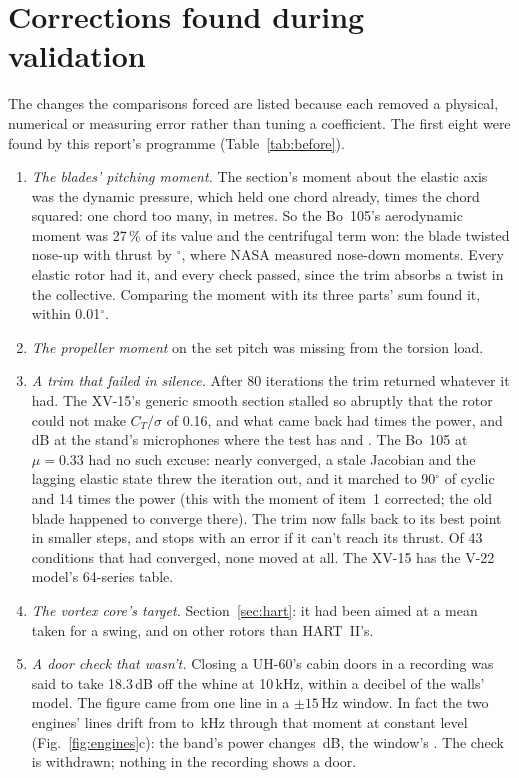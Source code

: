\documentclass[10pt,a4paper,twocolumn]{article}
\newcommand{\Tab}[1]{}
\begin{document}
\section{Corrections found during validation}\label{sec:review}
\begin{table}[t]
\centering\small
\caption{What this report's corrections changed.}\label{tab:before}
\resizebox{\columnwidth}{!}{\Tab{before}}
\end{table}
The changes the comparisons forced are listed because each removed a physical, numerical or measuring error rather than tuning a coefficient. The first eight were found by this report's programme (Table~\ref{tab:before}).
\begin{enumerate}
\item \emph{The blades' pitching moment.} The section's moment about the elastic axis was the dynamic pressure, which held one chord already, times the chord squared: one chord too many, in metres. So the Bo~105's aerodynamic moment was 27\,\% of its value and the centrifugal term won: the blade twisted nose-up with thrust by \NBoTwistBefore$^\circ$, where NASA measured nose-down moments. Every elastic rotor had it, and every check passed, since the trim absorbs a twist in the collective. Comparing the moment with its three parts' sum found it, within 0.01$^\circ$.
\item \emph{The propeller moment} on the set pitch was missing from the torsion load.
\item \emph{A trim that failed in silence.} After 80 iterations the trim returned whatever it had. The XV-15's generic smooth section stalled so abruptly that the rotor could not make $C_T/\sigma$ of 0.16, and what came back had \NXvFalse{} times the power, \NStBeforeHi{} and \NStBeforeFar\,dB at the stand's microphones where the test has \NStTestHi{} and \NStTestFarHi. The Bo~105 at $\mu=0.33$ had no such excuse: nearly converged, a stale Jacobian and the lagging elastic state threw the iteration out, and it marched to 90$^\circ$ of cyclic and 14 times the power (this with the moment of item~1 corrected; the old blade happened to converge there). The trim now falls back to its best point in smaller steps, and stops with an error if it can't reach its thrust. Of 43 conditions that had converged, none moved at all. The XV-15 has the V-22 model's 64-series table.
\item \emph{The vortex core's target.} Section~\ref{sec:hart}: it had been aimed at a mean taken for a swing, and on other rotors than HART~II's.
\item \emph{A door check that wasn't.} Closing a UH-60's cabin doors in a recording was said to take 18.3\,dB off the whine at 10\,kHz, within a decibel of the walls' model. The figure came from one line in a $\pm 15$\,Hz window. In fact the two engines' lines drift from \NDoFromA{} to \NDoToA\,kHz through that moment at constant level (Fig.~\ref{fig:engines}c): the band's power changes \NDoBand\,dB, the window's \NDoNarrow. The check is withdrawn; nothing in the recording shows a door.

\end{enumerate}
\end{document}
